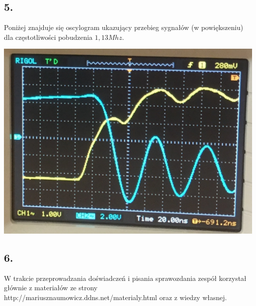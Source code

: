 \documentclass[polish,a4paper]{article}
\begin{document}
\newpage

\subsection*{5.}
Poniżej znajduje się oscylogram ukazujący przebieg sygnałów (w powiększeniu) dla częstotliwości pobudzenia $1,13Mhz$.\\
\begin{center}
\includegraphics[scale=0.4]{oscylogram}
\end{center}


\subsection*{6.}




\begin{thebibliography}{9}

  W trakcie przeprowadzania doświadczeń i pisania sprawozdania zespół korzystał głównie z materiałów ze strony http://mariusznaumowicz.ddns.net/materialy.html oraz z wiedzy własnej.

\end{thebibliography}
\end{document}
